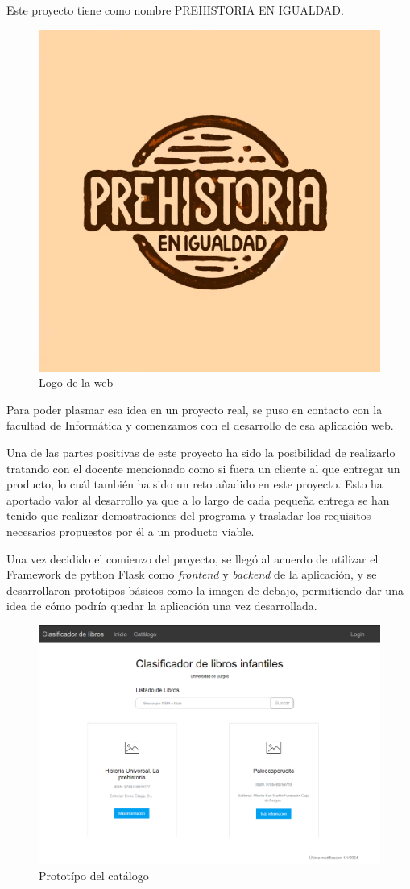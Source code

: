 Este proyecto tiene como nombre PREHISTORIA EN IGUALDAD.
\begin{figure}[h]
    \centering
\includegraphics[width=0.5\linewidth]{Imagenes/Logo.png}
    \caption{Logo de la web}
    \label{Logo de la web}
\end{figure}
\FloatBarrier

Para poder plasmar esa idea en un proyecto real, se puso en contacto con la facultad de Informática y comenzamos con el desarrollo de esa aplicación web.

Una de las partes positivas de este proyecto ha sido la posibilidad de realizarlo tratando con el docente mencionado como si fuera un cliente al que entregar un producto, lo cuál también ha sido un reto añadido en este proyecto. Esto ha aportado valor al desarrollo ya que a lo largo de cada pequeña entrega se han tenido que realizar demostraciones del programa y trasladar los requisitos necesarios propuestos por él a un producto viable.

Una vez decidido el comienzo del proyecto, se llegó al acuerdo de utilizar el Framework de python Flask como \textit{frontend} y \textit{backend} de la aplicación, y se desarrollaron prototipos básicos como la imagen de debajo, permitiendo dar una idea de cómo podría quedar la aplicación una vez desarrollada.

\begin{figure}[h]
    \centering
    \includegraphics[width=0.8\linewidth]{Imagenes/PrototipoCatalogo.png}
    \caption{Prototípo del catálogo}
    \label{Prototípo del catálogo}
\end{figure}
\FloatBarrier


